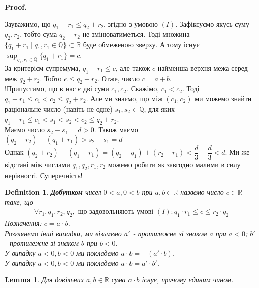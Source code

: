 \documentclass[a4paper, 14pt]{article}
\makeatletter
\def\qed{$\blacksquare$}
\theoremstyle{theoremdd}
\theoremstyle{theoremdd}
\newtheorem{definition}[theorem]{Definition}
\theoremstyle{theoremdd}
\theoremstyle{theoremdd}
\theoremstyle{theoremdd}
\theoremstyle{theoremdd}
\theoremstyle{theoremdd}
\newtheorem{lemma}[theorem]{Lemma}
\theoremstyle{theoremdd}
\renewenvironment{proof}[1][Proof.\\]{\par
\pushQED{\hfill \qed}%
\normalfont \topsep6\p@\@plus6\p@\relax
\trivlist
\item\relax
{\bfseries
#1\@addpunct{.}}\hspace\labelsep\ignorespaces
}{%
\popQED\endtrivlist\@endpefalse
}
\makeatother
\begin{document}
	\begin{proof}
	Зауважимо, що $q_1 + r_1 \leq q_2 + r_2$, згідно з умовою $(I)$. Зафіксуємо якусь суму $q_2, r_2$, тобто сума $q_2 + r_2$ не змінюватиметься. Тоді множина $\{q_1 + r_1 \mid q_1,r_1 \in \mathbb{Q}\} \subset \mathbb{R}$ буде обмеженою зверху. А тому існує $\displaystyle\sup_{q_1,r_1 \in \mathbb{Q}} \{ q_1 + r_1 \} = c$.\\
	За критерієм супремума, $q_1 + r_1 \leq c$, але також $c$ найменша верхня межа серед меж $q_2 + r_2$. Тобто $c \leq q_2 + r_2$. Отже, число $c = a + b$.
	\bigskip \\
	!Припустимо, що в нас є дві суми $c_1, c_2$. Скажімо, $c_1 < c_2$. Тоді $q_1 + r_1 \leq c_1 < c_2 \leq q_2 + r_2$. Але ми знаємо, що між $(c_1, c_2)$ ми можемо знайти раціональне число (навіть не одне) $s_1,s_2 \in \mathbb{Q}$, для яких\\
	$q_1 + r_1 \leq c_1 < s_1 < s_2 < c_2 \leq q_2 + r_2$.\\
	Маємо число $s_2 - s_1 = d > 0$. Також маємо\\
	$(q_2 + r_2) - (q_1 + r_1) > s_2 - s_1 = d$\\
	Однак $(q_2 + r_2) - (q_1 + r_1) = (q_2 - q_1) + (r_2 - r_1) < \dfrac{d}{3} + \dfrac{d}{3} < d$. Ми же відстані між числами $q_1,q_2,r_1,r_2$ можемо робити як завгодно малими в силу нерівності. Суперечність!
	\end{proof}
	
	\begin{definition}
	\textbf{Добутком} чисел $0 < a, 0 < b$ при $a,b \in \mathbb{R}$ назвемо число $c \in \mathbb{R}$ таке, що
	\begin{align*}
	\forall r_1, q_1, r_2, q_2, \text{ що задовольняють умові } (I): q_1 \cdot r_1 \leq c \leq r_2 \cdot q_2
	\end{align*}
	Позначення: $c = a \cdot b$.\\
	Розглянемо інші випадки, ми візьмемо $a'$ - протилежне зі знаком $a$ при $a < 0$; $b'$ - протилежне зі знаком $b$ при $b < 0$.\\
	У випадку $a < 0, b < 0$ ми покладемо $a \cdot b = - (a' \cdot b)$.\\
	У випадку $a < 0, b < 0$ ми покладемо $a \cdot b = a' \cdot b'$.
	\end{definition}
	
	\begin{lemma}
	Для довільних $a,b \in \mathbb{R}$ сума $a \cdot b$ існує, причому єдиним чином.
	\end{lemma}
	
\end{document}
